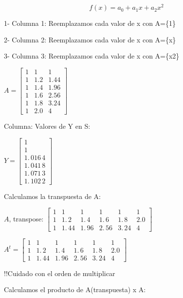 \documentclass{article}
\begin{document}
\[
f(x)=a_{0}+a_{1}x+a_{2}x^{2} 
\]

1- Columna 1: Reemplazamos cada valor de x con A=\{1\}

2- Columna 2: Reemplazamos cada valor de x con A=\{x\}

3- Columna 3: Reemplazamos cada valor de x con A=\{x2\}

$A=\left[ 
\begin{array}{ccc}
1 & 1 & 1 \\ 
1 & 1.2 & 1.44 \\ 
1 & 1.4 & 1.96 \\ 
1 & 1.6 & 2.56 \\ 
1 & 1.8 & 3.24 \\ 
1 & 2.0 & 4%
\end{array}%
\right] $

\bigskip Columna: Valores de Y en S:

$Y=\left[ 
\begin{array}{c}
1 \\ 
1 \\ 
1.\,\allowbreak 016\,4 \\ 
1.\,\allowbreak 041\,8 \\ 
1.\,\allowbreak 071\,3 \\ 
1.\,\allowbreak 102\,2%
\end{array}%
\right] $

\bigskip

Calculamos la transpuesta de A:

$A$, transpose: $\left[ 
\begin{array}{cccccc}
1 & 1 & 1 & 1 & 1 & 1 \\ 
1 & 1.\,\allowbreak 2 & 1.\,\allowbreak 4 & 1.\,\allowbreak 6 & 
1.\,\allowbreak 8 & 2.0 \\ 
1 & 1.\,\allowbreak 44 & 1.\,\allowbreak 96 & 2.\,\allowbreak 56 & 
3.\,\allowbreak 24 & 4%
\end{array}%
\right] \allowbreak $

$A^{t}=\left[ 
\begin{array}{cccccc}
1 & 1 & 1 & 1 & 1 & 1 \\ 
1 & 1.\,\allowbreak 2 & 1.\,\allowbreak 4 & 1.\,\allowbreak 6 & 
1.\,\allowbreak 8 & 2.0 \\ 
1 & 1.\,\allowbreak 44 & 1.\,\allowbreak 96 & 2.\,\allowbreak 56 & 
3.\,\allowbreak 24 & 4%
\end{array}%
\right] $

!!Cuidado con el orden de multiplicar

Calculamos el producto de A(transpuesta) x A:
\end{document}
